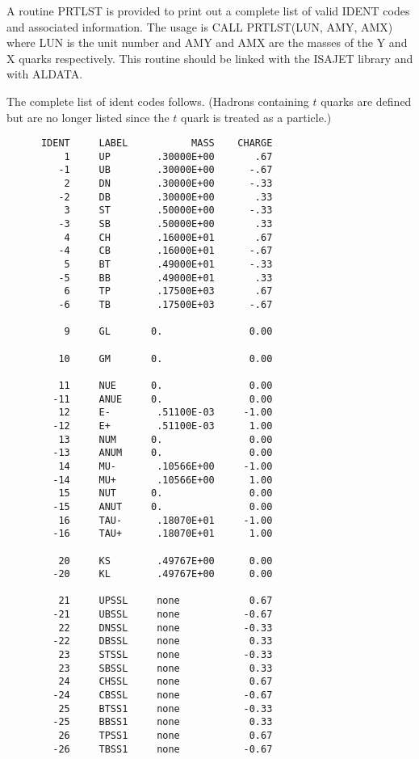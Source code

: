       A routine PRTLST is provided to print out a complete list of valid
IDENT codes and associated information. The usage is
      CALL PRTLST(LUN, AMY, AMX)
where LUN is the unit number and AMY and AMX are the masses of the Y and
X quarks respectively. This routine should be linked with the ISAJET
library and with ALDATA.

      The complete list of ident codes follows. (Hadrons containing $t$
quarks are defined but are no longer listed since the $t$ quark is
treated as a particle.)
\begin{verbatim}
      IDENT     LABEL           MASS    CHARGE
          1     UP        .30000E+00       .67
         -1     UB        .30000E+00      -.67
          2     DN        .30000E+00      -.33
         -2     DB        .30000E+00       .33
          3     ST        .50000E+00      -.33
         -3     SB        .50000E+00       .33
          4     CH        .16000E+01       .67
         -4     CB        .16000E+01      -.67
          5     BT        .49000E+01      -.33
         -5     BB        .49000E+01       .33
          6     TP        .17500E+03       .67
         -6     TB        .17500E+03      -.67

          9     GL       0.               0.00

         10     GM       0.               0.00

         11     NUE      0.               0.00
        -11     ANUE     0.               0.00
         12     E-        .51100E-03     -1.00
        -12     E+        .51100E-03      1.00
         13     NUM      0.               0.00
        -13     ANUM     0.               0.00
         14     MU-       .10566E+00     -1.00
        -14     MU+       .10566E+00      1.00
         15     NUT      0.               0.00
        -15     ANUT     0.               0.00
         16     TAU-      .18070E+01     -1.00
        -16     TAU+      .18070E+01      1.00

         20     KS        .49767E+00      0.00
        -20     KL        .49767E+00      0.00

         21     UPSSL     none            0.67
        -21     UBSSL     none           -0.67
         22     DNSSL     none           -0.33
        -22     DBSSL     none            0.33
         23     STSSL     none           -0.33
         23     SBSSL     none            0.33
         24     CHSSL     none            0.67
        -24     CBSSL     none           -0.67
         25     BTSS1     none           -0.33
        -25     BBSS1     none            0.33
         26     TPSS1     none            0.67
        -26     TBSS1     none           -0.67


\end{verbatim}
